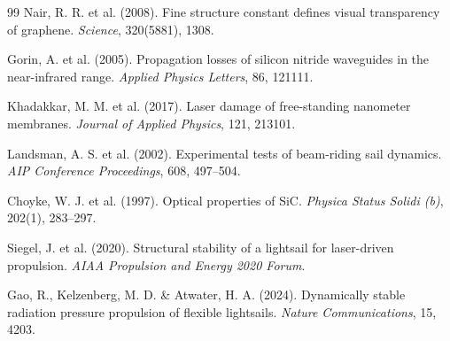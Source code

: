 \documentclass[11pt,a4paper,onecolumn]{article}
\begin{document}
\begin{thebibliography}{99}
 Nair, R. R. et al. (2008). Fine structure constant defines visual transparency of graphene. \textit{Science}, 320(5881), 1308.

 Gorin, A. et al. (2005). Propagation losses of silicon nitride waveguides in the near-infrared range. \textit{Applied Physics Letters}, 86, 121111.

 Khadakkar, M. M. et al. (2017). Laser damage of free-standing nanometer membranes. \textit{Journal of Applied Physics}, 121, 213101.

 Landsman, A. S. et al. (2002). Experimental tests of beam-riding sail dynamics. \textit{AIP Conference Proceedings}, 608, 497--504.

 Choyke, W. J. et al. (1997). Optical properties of SiC. \textit{Physica Status Solidi (b)}, 202(1), 283--297.

 Siegel, J. et al. (2020). Structural stability of a lightsail for laser-driven propulsion. \textit{AIAA Propulsion and Energy 2020 Forum}.

 Gao, R., Kelzenberg, M. D. \& Atwater, H. A. (2024). Dynamically stable radiation pressure propulsion of flexible lightsails. \textit{Nature Communications}, 15, 4203.

\end{thebibliography}
\end{document}

